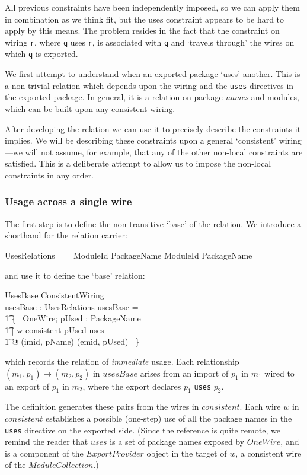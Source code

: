 \documentclass[a4paper,12pt]{article}
\begin{document}
All previous constraints have been independently imposed, so we can apply them in combination as we think fit, but the uses constraint appears to be hard to apply by this means.  The problem resides in the fact that the constraint on wiring {\tt r}, where {\tt q} uses {\tt r}, is associated with {\tt q} and `travels through' the wires on which {\tt q} is exported.

We first attempt to understand when an exported package `uses' another.  This is a non-trivial relation which depends upon the wiring and the {\tt uses} directives in the exported package. In general, it is a relation on package \emph{names} and modules, which can be built upon any consistent wiring.

After developing the relation we can use it to precisely describe the constraints it implies. We will be describing these constraints upon a general `consistent' wiring---we will not assume, for example, that any of the other non-local constraints are satisfied. This is a deliberate attempt to allow us to impose the non-local constraints in any order.

\subsubsection*{Usage across a single wire}

The first step is to define the non-transitive `base' of the relation. We introduce a shorthand for the relation carrier:
\begin{zed}
	UsesRelations == ModuleId \cross PackageName \rel ModuleId \cross PackageName
\end{zed}
and use it to define the `base' relation:
\begin{schema}{UsesBase}
	ConsistentWiring	\\
	usesBase : UsesRelations
\where
	usesBase = 	\\
	\t1 \{~ OneWire; pUsed : PackageName \\
	\t1 | w \in consistent \land pUsed \in uses \\
	\t1 @ (imid, pName) \mapsto (emid, pUsed) ~\}
\end{schema}
which records the relation of \emph{immediate} usage. 
Each relationship $(m_1, p_1) \mapsto (m_2, p_2)$ in $usesBase$ arises from an import of $p_1$ in $m_1$ wired to an export of $p_1$ in $m_2$, where the export declares $p_1$ {\tt uses} $p_2$. 

The definition generates these pairs from the wires in $consistent$. Each wire $w$ in $consistent$ establishes a possible (one-step) use of all the package names in the {\tt uses} directive on the exported side. (Since the reference is quite remote, we remind the reader that $uses$ is a set of package names exposed by $OneWire$, and is a component of the $ExportProvider$ object in the target of $w$, a consistent wire of the $ModuleCollection$.)
\end{document}
